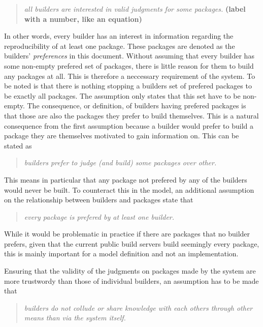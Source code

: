 \documentclass[english, biblatex, digitaloutput]{kththesis}
\begin{document}
\begin{quote}
	\textit{all builders are interested in valid judgments for some packages.}
	\textbf{(label with a number, like an equation)}
\end{quote}

In other words, every builder has an interest in information regarding the reproducibility of at least one package. These packages are denoted as the builders' \textit{preferences} in this document. Without assuming that every builder has some non-empty prefered set of packages, there is little reason for them to build any packages at all. This is therefore a neccessary requirement of the system. To be noted is that there is nothing stopping a builders set of prefered packages to be exactly all packages. The assumption only states that this set have to be non-empty. The consequence, or definition, of builders having prefered packages is that those are also the packages they prefer to build themselves. This is a natural consequence from the first assumption because a builder would prefer to build a package they are themselves motivated to gain information on. This can be stated as

\begin{quote}
	\textit{builders prefer to judge (and build) some packages over other.}
\end{quote}

This means in particular that any package not prefered by any of the builders would never be built. To counteract this in the model, an additional assumption on the relationship between builders and packages state that

\begin{quote}
	\textit{every package is prefered by at least one builder.}
\end{quote}

While it would be problematic in practice if there are packages that no builder prefers, given that the current public build servers build seemingly every package, this is mainly important for a model definition and not an implementation.

Ensuring that the validity of the judgments on packages made by the system are more trustwordy than those of individual builders, an assumption has to be made that

\begin{quote}
	\textit{builders do not collude or share knowledge with each others through other means than via the system itself.}
\end{quote}
\end{document}
